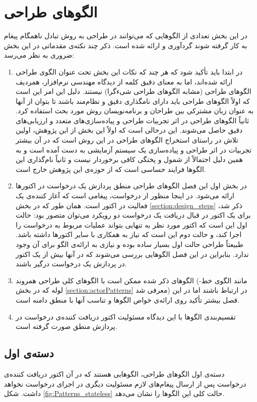 \section{الگوهای طراحی}
در این بخش تعدادی از الگوهایی که می‌توانند در طراحی به روش تبادل ناهمگام پیغام به کار گرفته شوند گردآوری و ارائه شده است. ذکر چند نکته‌ی مقدماتی در این بخش ضروری به نظر می‌رسد:
\begin{enumerate}


\item در ابتدا باید تأکید شود که هر چند که نکات این بخش تحت عنوان الگوی طراحی ارائه شده‌اند، اما به معنای دقیق کلمه از دیدگاه مهندسی نرم‌افزار، همردیف الگوهای طراحی (مشابه الگوهای طراحی شیءگرا\cite{GOF})  نیستند. دلیل این امر این است که اولاً الگوهای طراحی باید دارای نامگذاری دقیق و نظام‌مند باشند تا بتوان از آنها به عنوان زبان مشترکی بین طراحان و برنامه‌نویسان روش مورد بحث استفاده کرد. ثانیاً الگوهای طراحی در اثر تجربیات طراحی و پیاده‌سازی‌های متعدد و  ارزیابی‌های دقیق حاصل می‌شوند. این درحالی‌ است که اولاً این بخش از این پژوهش، اولین تلاش در راستای استخراج الگوهای طراحی در این روش است که در آن بیشتر تجربیات در اثر طراحی و پیاده‌سازی یک سیستم آزمایشی به دست آمده است و به همین دلیل احتمالاً از شمول و پختگی کافی برخوردار نیست و ثانیاً نام‌گذاری این الگوها فرایند حساسی‌ است که از حوزه‌ی این پژوهش خارج است. 
\item در بخش اول این فصل الگوهای طراحی منطق پردازش یک درخواست در اکتورها ارائه می‌شود. در اینجا منظور از درخواست، پیغامی است که آغاز کننده‌ی یک فعالیت در اکتور است.  همان طور که در بخش \ref{section:design_steps} ذکر شد، برای یک اکتور در قبال دریافت یک درخواست دو رویکرد می‌توان متصور بود: حالت اول این است که اکتور مورد نظر به تنهایی بتواند عملیات مربوط به درخواست را اجرا کند، و حالت دوم این است که نیاز به همکاری با سایر اکتورها داشته باشد. طبیعتاً طراحی حالت اول بسیار ساده بوده و نیازی به ارائه‌ی الگو برای آن وجود ندارد. بنابراین در این فصل الگوهایی بررسی می‌شوند که در آنها بیش از یک اکتور در پردازش یک درخواست درگیر باشند.
\item الگوهای ذکر شده ممکن است با الگوهای کلی طراحی همروند (مانند الگوی خط-لوله که در بخش \ref{section:actorPatterns} معرفی شد) در ارتباط باشند اما در این فصل بیشتر تأکید روی ارائه‌ی خواص الگوها و تناسب آنها با منطق دامنه است.
\item تقسیم‌بندی الگوها با این دیدگاه مسئولیت اکتور دریافت کننده‌ی درخواست در پردازش منطق صورت گرفته است. 
\end{enumerate}

\subsection{دسته‌ی اول}
دسته‌ی اول الگوهای طراحی، الگوهایی هستند که در آن اکتور دریافت کننده‌ی درخواست پس از ارسال پیغام‌های لازم مسئولیت دیگری در اجرای درخواست نخواهد داشت. شکل \ref{fig:Patterns_stateless} حالت کلی این الگوها را نشان می‌دهد.

